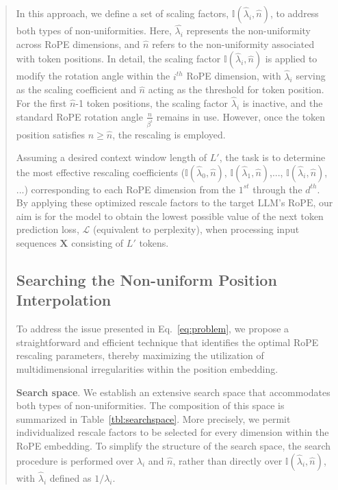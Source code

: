 \begin{abstract}
In this approach, we define a set of scaling factors, $\mathbb{I}(\hat{\lambda}_{i},\hat{n})$, to address both types of non-uniformities. Here, $\hat{\lambda_i}$ represents the non-uniformity across RoPE dimensions, and $\hat{n}$ refers to the non-uniformity associated with token positions. In detail, the scaling factor $\mathbb{I}(\hat{\lambda}_{i},\hat{n})$ is applied to modify the rotation angle within the $i^{th}$ RoPE dimension, with $\hat{\lambda}_{i}$ serving as the scaling coefficient and $\hat{n}$ acting as the threshold for token position. For the first $\hat{n}$-1 token positions, the scaling factor $\hat{\lambda}_{i}$ is inactive, and the standard RoPE rotation angle $\frac{n}{\beta^i}$ remains in use. However, once the token position satisfies $n \ge \hat{n}$, the rescaling is employed.

Assuming a desired context window length of $L'$, the task is to determine the most effective rescaling coefficients ($\mathbb{I}(\hat{\lambda}_{0},\hat{n})$, $\mathbb{I}(\hat{\lambda}_{1},\hat{n})$,..., $\mathbb{I}(\hat{\lambda}_{i},\hat{n})$, ...) corresponding to each RoPE dimension from the $1^{st}$ through the $d^{th}$. By applying these optimized rescale factors to the target $\text{LLM}$'s $\text{RoPE}$, our aim is for the model to obtain the lowest possible value of the next token prediction loss, $\mathcal{L}$ (equivalent to perplexity), when processing input sequences $\mathbf{X}$ consisting of $L'$ tokens.

\subsection{Searching the Non-uniform Position Interpolation}

To address the issue presented in Eq.~\ref{eq:problem}, we propose a straightforward and efficient technique that identifies the optimal RoPE rescaling parameters, thereby maximizing the utilization of multidimensional irregularities within the position embedding.

\textbf{Search space}. We establish an extensive search space that accommodates both types of non-uniformities. The composition of this space is summarized in Table~\ref{tbl:searchspace}. More precisely, we permit individualized rescale factors to be selected for every dimension within the RoPE embedding. To simplify the structure of the search space, the search procedure is performed over $\lambda_i$ and $\hat{n}$, rather than directly over $\mathbb{I}(\hat{\lambda}_{i},\hat{n})$, with $\hat{\lambda}_{i}$ defined as $1/\lambda_i$.


\end{abstract}
